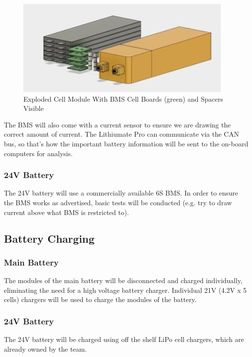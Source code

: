 \documentclass[main.tex]{subfiles}
\begin{document}
     \begin{figure}[H]
        \centering
        \includegraphics[width=\linewidth]{images/ExplodedModule}
        \caption{Exploded Cell Module With BMS Cell Boards (green) and Spacers Visible}
        \label{fig:exploded-cell}
    \end{figure}
     
	The BMS will also come with a current sensor to ensure we are drawing the correct amount of current.
	The Lithiumate Pro can communicate via the CAN bus, so that's how the important battery information will be sent to the on-board computers for analysis.     
     
    \subsubsection{24V Battery}
	The 24V battery will use a commercially available 6S BMS. In order to ensure the BMS works as advertised, basic tests will be conducted (e.g. try to draw current above what BMS is restricted to).
    
	\subsection{Battery Charging}
    \subsubsection{Main Battery} 
	The modules of the main battery will be disconnected and charged individually, eliminating the need for a high voltage battery charger. Individual 21V (4.2V x 5 cells) chargers will be used to charge the modules of the battery.
    \subsubsection{24V Battery}
    The 24V battery will be charged using off the shelf LiPo cell chargers, which are already owned by the team.
    
\end{document}

